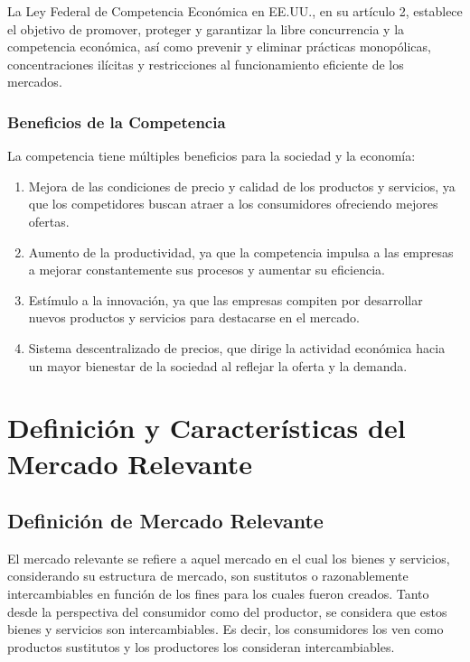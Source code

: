 \documentclass[
  letterpaper,
  DIV=11,
  numbers=noendperiod]{scrartcl}
\providecommand{\tightlist}{%
  \setlength{\itemsep}{0pt}\setlength{\parskip}{0pt}}\usepackage{longtable,booktabs,array}
\begin{document}
La Ley Federal de Competencia Económica en EE.UU., en su artículo 2,
establece el objetivo de promover, proteger y garantizar la libre
concurrencia y la competencia económica, así como prevenir y eliminar
prácticas monopólicas, concentraciones ilícitas y restricciones al
funcionamiento eficiente de los mercados.

\hypertarget{beneficios-de-la-competencia}{%
\subsubsection{Beneficios de la
Competencia}\label{beneficios-de-la-competencia}}

La competencia tiene múltiples beneficios para la sociedad y la
economía:

\begin{enumerate}
\def\labelenumi{\arabic{enumi}.}
\tightlist
\item
  Mejora de las condiciones de precio y calidad de los productos y
  servicios, ya que los competidores buscan atraer a los consumidores
  ofreciendo mejores ofertas.
\item
  Aumento de la productividad, ya que la competencia impulsa a las
  empresas a mejorar constantemente sus procesos y aumentar su
  eficiencia.
\item
  Estímulo a la innovación, ya que las empresas compiten por desarrollar
  nuevos productos y servicios para destacarse en el mercado.
\item
  Sistema descentralizado de precios, que dirige la actividad económica
  hacia un mayor bienestar de la sociedad al reflejar la oferta y la
  demanda.
\end{enumerate}

\hypertarget{definiciuxf3n-y-caracteruxedsticas-del-mercado-relevante}{%
\section{Definición y Características del Mercado
Relevante}\label{definiciuxf3n-y-caracteruxedsticas-del-mercado-relevante}}

\hypertarget{definiciuxf3n-de-mercado-relevante}{%
\subsection{Definición de Mercado
Relevante}\label{definiciuxf3n-de-mercado-relevante}}

El mercado relevante se refiere a aquel mercado en el cual los bienes y
servicios, considerando su estructura de mercado, son sustitutos o
razonablemente intercambiables en función de los fines para los cuales
fueron creados. Tanto desde la perspectiva del consumidor como del
productor, se considera que estos bienes y servicios son
intercambiables. Es decir, los consumidores los ven como productos
sustitutos y los productores los consideran intercambiables.
\end{document}
